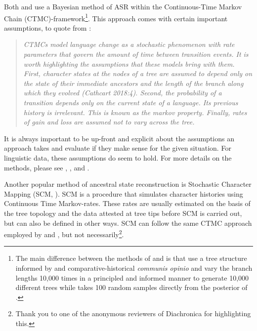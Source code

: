 \documentclass[12pt,letterpaper]{article}
\begin{document}
Both \citet{carling2021reconstructing} and \citet{goldstein_2022} use a Bayesian method of ASR within the Continuous-Time Markov Chain (CTMC)-framework\footnote{The main difference between the methods of \citet{carling2021reconstructing} and \citet{goldstein_2022} is that \citet{carling2021reconstructing} use a tree structure informed by \citet{chang2015ancestry} and comparative-historical \emph{communis opinio} and vary the branch lengths 10,000 times in a principled and informed manner to generate 10,000 different trees while \citet{goldstein_2022} takes 100 random samples directly from the posterior of \citet{chang2015ancestry}.}. This approach comes with certain important assumptions, to quote from \citet[77]{goldstein_2022}:

\begin{quotation} \emph{
CTMCs model language change as a stochastic phenomenon with rate parameters that govern the amount of time between transition events. It is worth highlighting the assumptions that these models bring with them. First, character states at the nodes of a tree are assumed to depend only on the state of their immediate ancestors and the length of the branch along which they evolved (Cathcart 2018:4). Second, the probability of a transition depends only on the current state of a language. Its previous history is irrelevant. This is known as the markov property. Finally, rates of gain and loss are assumed not to vary across the tree.}
\end{quotation}

It is always important to be up-front and explicit about the assumptions an approach takes and evaluate if they make sense for the given situation. For linguistic data, these assumptions do seem to hold. For more details on the methods, please see  \citet{goldstein_2022}, \citet{pagel2004bayesian}, \citet{ronquist2004bayesian} and \citet{liggett2010continuous}. 

Another popular method of ancestral state reconstruction is Stochastic Character Mapping (SCM, \citet{huelsenbeck2003stochastic}). SCM is a procedure that simulates character histories using Continuous Time Markov-rates. These rates are usually estimated on the basis of the tree topology and the data attested at tree tips before SCM is carried out, but can also be defined in other ways. SCM can follow the same CTMC approach employed by \citet{carling2021reconstructing} and \citet{goldstein_2022}, but not necessarily\footnote{Thank you to one of the anonymous reviewers of Diachronica for highlighting this.}.
\end{document}
